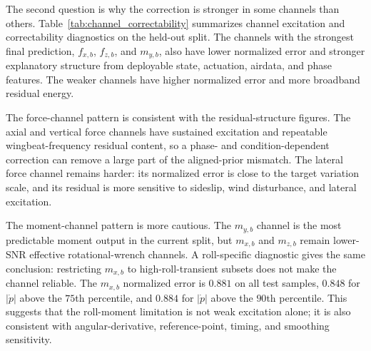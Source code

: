 The second question is why the correction is stronger in some channels than others. Table~\ref{tab:channel_correctability} summarizes channel excitation and correctability diagnostics on the held-out split. The channels with the strongest final prediction, $f_{x,b}$, $f_{z,b}$, and $m_{y,b}$, also have lower normalized error and stronger explanatory structure from deployable state, actuation, airdata, and phase features. The weaker channels have higher normalized error and more broadband residual energy.

\begin{table}[t]
\centering
\caption{Held-out channel excitation and correctability diagnostics. The deployable ridge $R^2$ uses simulator-available phase, airdata, body-rate, and control features only; angular acceleration is excluded because it is part of moment-label reconstruction.}
\label{tab:channel_correctability}
\end{table}

The force-channel pattern is consistent with the residual-structure figures. The axial and vertical force channels have sustained excitation and repeatable wingbeat-frequency residual content, so a phase- and condition-dependent correction can remove a large part of the aligned-prior mismatch. The lateral force channel remains harder: its normalized error is close to the target variation scale, and its residual is more sensitive to sideslip, wind disturbance, and lateral excitation.

The moment-channel pattern is more cautious. The $m_{y,b}$ channel is the most predictable moment output in the current split, but $m_{x,b}$ and $m_{z,b}$ remain lower-SNR effective rotational-wrench channels. A roll-specific diagnostic gives the same conclusion: restricting $m_{x,b}$ to high-roll-transient subsets does not make the channel reliable. The $m_{x,b}$ normalized error is $0.881$ on all test samples, $0.848$ for $|\dot{p}|$ above the $75$th percentile, and $0.884$ for $|\dot{p}|$ above the $90$th percentile. This suggests that the roll-moment limitation is not weak excitation alone; it is also consistent with angular-derivative, reference-point, timing, and smoothing sensitivity.


